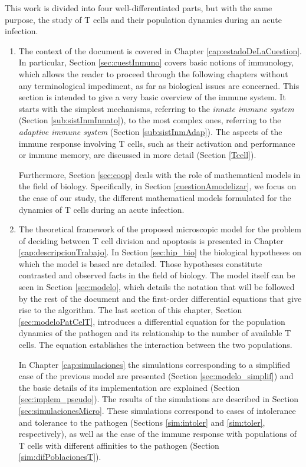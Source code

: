 This work is divided into four well-differentiated parts, but with the same purpose, the study of T cells and their population dynamics during an acute infection. 

\begin{enumerate}
	\item The context of the document is covered in Chapter \ref{cap:estadoDeLaCuestion}. In particular, Section \ref{sec:cuestInmuno} covers basic notions of immunology, which allows the reader to proceed through the following chapters without any terminological impediment, as far as biological issues are concerned. This section is intended to give a very basic overview of the immune system. It starts with the simplest mechanisms, referring to the \textit{innate immune system} (Section \ref{sub:sistInmInnato}), to the most complex ones, referring to the \textit{adaptive immune system} (Section \ref{sub:sistInmAdap}). The aspects of the immune response involving T cells, such as their activation and performance or immune memory, are discussed in more detail (Section \ref{Tcell}).
	
	Furthermore, Section \ref{sec:coop} deals with the role of mathematical models in the field of biology. Specifically, in Section \ref{cuestionAmodelizar}, we focus on the case of our study, the different mathematical models formulated for the dynamics of T cells during an acute infection. 
	
	\item The theoretical framework of the proposed microscopic model for the problem of deciding between T cell division and apoptosis is presented in Chapter \ref{cap:descripcionTrabajo}. In Section \ref{sec:hip_bio} the biological hypotheses on which the model is based are detailed. Those hypotheses constitute contrasted and observed facts in the field of biology. The model itself can be seen in Section \ref{sec:modelo}, which details the notation that will be followed by the rest of the document and the first-order differential equations that give rise to the algorithm. The last section of this chapter, Section \ref{sec:modeloPatCelT}, introduces a differential equation for the population dynamics of the pathogen and its relationship to the number of available T cells. The equation establishes the interaction between the two populations.
		
	In Chapter \ref{cap:simulaciones} the simulations corresponding to a simplified case of the previous model are presented (Section \ref{sec:modelo_simplif}) and the basic details of its implementation are explained (Section \ref{sec:implem_pseudo}). The results of the simulations are described in Section \ref{sec:simulacionesMicro}. These simulations correspond to cases of intolerance and tolerance to the pathogen (Sections \ref{sim:intoler} and \ref{sim:toler}, respectively), as well as the case of the immune response with populations of T cells with different affinities to the pathogen (Section \ref{sim:difPoblacionesT}).
	

\end{enumerate}
